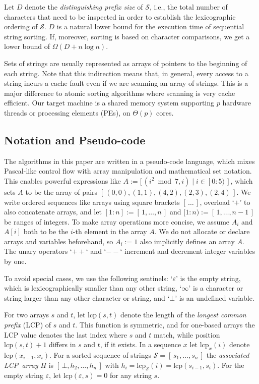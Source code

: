 \documentclass[a4paper]{myjournal}
\newcommand{\Th}[1]{\Theta\!\left( #1\right)}
\newcommand{\lcp}{\mathrm{lcp}}
\newcommand{\Strings}{\mathcal{S}}
\newcommand{\arr}[1]{[\, #1 \,]}
\newcommand{\Inc}{{++}}
\newcommand{\Dec}{{--}}
\begin{document}
Let $D$ denote the \emph{distinguishing prefix size} of $\Strings$, i.e., the
total number of characters that need to be inspected in order to establish the
lexicographic ordering of $\Strings$. $D$ is a natural lower bound for the
execution time of sequential string sorting. If, moreover, sorting is based on
character comparisons, we get a lower bound of $\Omega(D + n \log n)$.

Sets of strings are usually represented as arrays of pointers to the beginning
of each string. Note that this indirection means that, in general, every access
to a string incurs a cache fault even if we are scanning an array of strings.
This is a major difference to atomic sorting algorithms where scanning is very
cache efficient.  Our target machine is a shared memory system supporting $p$
hardware threads or processing elements (PEs), on $\Th{p}$ cores.

\subsection{Notation and Pseudo-code}

The algorithms in this paper are written in a pseudo-code language, which mixes
Pascal-like control flow with array manipulation and mathematical set notation.
This enables powerful expressions like $A := \arr{ (i^2 \bmod 7, i) \mid i \in
  [0 \mathop{:} 5) }$, which sets $A$ to be the array of pairs $\arr{ (0,0), (1,1), (4,2),
  (2,3), (2,4) }$. We write ordered sequences like arrays using square brackets
$\arr{ \ldots }$, overload `$+$' to also concatenate arrays, and let $[1 \mathop{:} n] :=
\arr{ 1,\ldots,n }$ and $[1 \mathop{:} n) := \arr{ 1,\ldots,n-1 }$ be ranges of integers.  To
make array operations more concise, we assume $A_i$ and $A[i]$ both to be the
$i$-th element in the array $A$. We do not allocate or declare arrays and
variables beforehand, so $A_i := 1$ also implicitly defines an array $A$. The
unary operators `$\Inc$` and `$\Dec$` increment and decrement integer variables
by one.

To avoid special cases, we use the following sentinels: `$\varepsilon$' is the
empty string, which is lexicographically smaller than any other string,
`$\infty$' is a character or string larger than any other character or string,
and `$\bot$' is an undefined variable.

For two arrays $s$ and $t$, let $\lcp(s,t)$ denote the length of the
\emph{longest common prefix} (LCP) of $s$ and $t$. This function is symmetric,
and for one-based arrays the LCP value denotes the last index where $s$ and $t$
match, while position $\lcp(s,t)+1$ differs in $s$ and $t$, if it exists.  In a
sequence $x$ let $\lcp_x(i)$ denote $\lcp(x_{i-1},x_i)$. For a sorted sequence
of strings $\Strings = \arr{ s_1,\ldots,s_n }$ the \emph{associated LCP~array}
$H$ is $\arr{ \bot,h_2,\ldots,h_n }$ with $h_i = \lcp_{\Strings}(i) =
\lcp(s_{i-1},s_i)$. For the empty string $\varepsilon$, let $\lcp(\varepsilon,s)
= 0$ for any string $s$.
\end{document}
